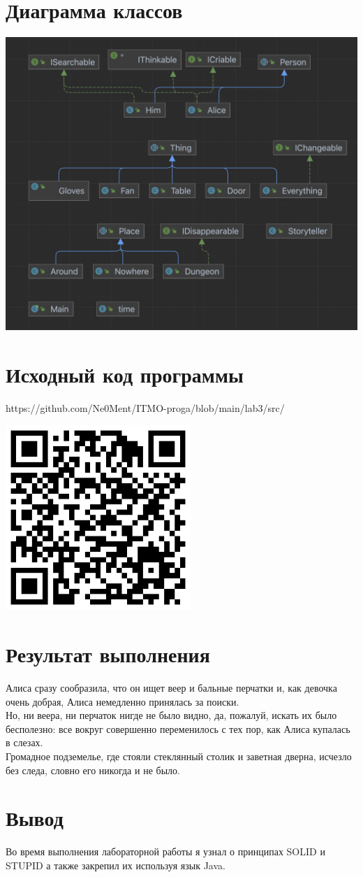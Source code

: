 \documentclass[12pt,onecolumn]{article}
\begin{document}
\section{Диаграмма классов}
\includegraphics[width=\columnwidth]{imgs/lab3_diagram.png}

\section{Исходный код программы}
https://github.com/Ne0Ment/ITMO-proga/blob/main/lab3/src/
\begin{center}
  \includegraphics[width=7cm]{imgs/lab3_qr.png}
\end{center}
\section{Результат выполнения}
Алиса сразу сообразила, что он ищет веер и бальные перчатки и, как девочка очень добрая, Алиса немедленно принялась за поиски. \\
Но, ни веера, ни перчаток нигде не было видно, да, пожалуй, искать их было бесполезно: все вокруг совершенно переменилось с тех пор, как Алиса купалась в слезах. \\
Громадное подземелье, где стояли стеклянный столик и заветная дверна, исчезло без следа, словно его никогда и не было. \\
\section{Вывод}
Во время выполнения лабораторной работы я узнал о принципах SOLID и STUPID а также закрепил их используя язык Java.
\end{document}
